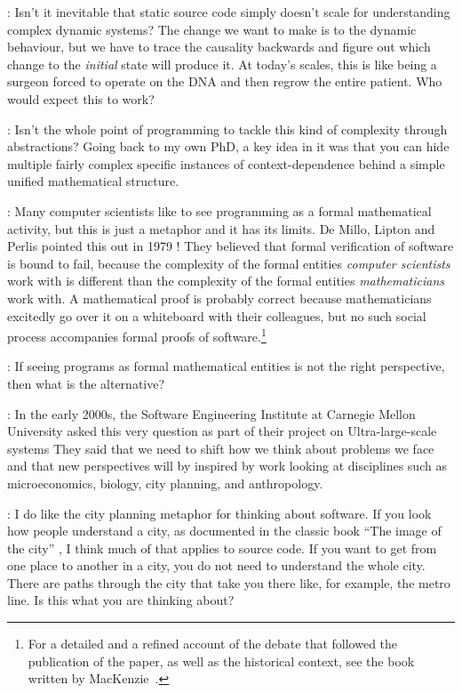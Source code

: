 \documentclass[runningheads]{llncs}
\newcommand{\T}{Tomas}
\newcommand{\J}{Joel}
\newcommand{\says}[2][gg]{\vspace{0.5em}\noindent\hangindent=0.5cm{\textsc{#1}}: #2}
\begin{document}
\says[\J]{Isn't it inevitable that static source code simply doesn't scale for understanding complex dynamic systems? The change we want to make is to the dynamic behaviour, but we have to trace the causality backwards and figure out which change to the \emph{initial} state will produce it. At today's scales, this is like being a surgeon forced to operate on the DNA and then regrow the entire patient. Who would expect this to work?}

\says[\T]{Isn't the whole point of programming to tackle this kind of complexity through abstractions? Going back to my own PhD, a key idea in it was that you can hide multiple fairly complex specific instances of context-dependence behind a simple unified mathematical structure.}

\says[\J]{Many computer scientists like to see programming as a formal mathematical activity, but this is just a metaphor and it has its limits. De Millo, Lipton and Perlis
pointed this out in 1979 \cite{demillo-1979-proofs}! They believed that formal verification of software is bound to fail, because the complexity of the formal entities \emph{computer scientists} work with is different than the complexity of the formal entities \emph{mathematicians} work with. A mathematical proof is probably correct because mathematicians excitedly go over it on a whiteboard with their colleagues, but no such social process accompanies formal proofs of software.\footnote{For a detailed and a refined account of the debate that followed the publication of the paper, as well as the historical context, see the book written by MacKenzie~\cite{mackenzie-2001-proof}.}}

\says[\T]{If seeing programs as formal mathematical entities is not the right perspective, then what is the alternative?}

\says[\J]{In the early 2000s, the Software Engineering Institute at Carnegie Mellon University asked this very question as part of their project on Ultra-large-scale systems \cite{feiler-2006-ulss} They said that we need to shift how we think about problems we face and that new perspectives will by inspired by work looking at disciplines such as microeconomics, biology, city planning, and anthropology.}

\says[\T]{I do like the city planning metaphor for thinking about software. If you look how people understand a city, as documented in the classic book ``The image of the city'' \cite{lynch-1960-image}, I think much of that applies to source code. If you want to get from one place to another in a city, you do not need to understand the whole city. There are paths through the city that take you there like, for example, the metro line. Is this what you are thinking about?}
\end{document}
